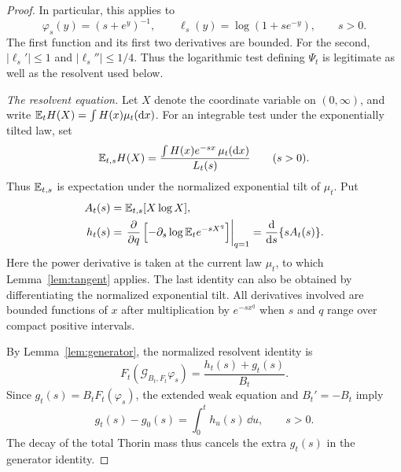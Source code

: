 \begin{proof}
In particular, this applies to
\[
 \varphi_s(y)=(s+e^y)^{-1},\qquad \ell_s(y)=\log(1+se^{-y}),\qquad s>0.
\]
The first function and its first two derivatives are bounded.
For the second, $|\ell_s'|\le1$ and $|\ell_s''|\le1/4$.
Thus the logarithmic test defining $\Psi_t$ is legitimate as well as the resolvent used below.

\medskip\noindent\emph{The resolvent equation.}
Let $X$ denote the coordinate variable on $(0,\infty)$, and write $\mathbb E_t H(X)=\int H(x)\mu_t(\mathop{}\!\mathrm d x)$.
For an integrable test under the exponentially tilted law, set
\[
 \mathbb E_{t,s}H(X)=\frac{\int H(x)e^{-sx}\,\mu_t(\mathop{}\!\mathrm d x)}{L_t(s)}
 \qquad(s>0).
\]
Thus $\mathbb E_{t,s}$ is expectation under the normalized exponential tilt of $\mu_t$.
Put
\begin{equation}
 \begin{aligned}
 A_t(s)&=\mathbb E_{t,s}[X\log X],\\
 h_t(s)&=\left.\frac{\partial}{\partial q}
 \left[-\partial_s\log\mathbb E_t e^{-sX^q}\right]\right|_{q=1}
 =\frac{\mathop{}\!\mathrm d}{\mathop{}\!\mathrm d s}\{sA_t(s)\}.
 \end{aligned}
 \label{eq:id-current-tangent}
\end{equation}
Here the power derivative is taken at the current law $\mu_t$, to which Lemma~\ref{lem:tangent} applies.
The last identity can also be obtained by differentiating the normalized exponential tilt.
All derivatives involved are bounded functions of $x$ after multiplication by $e^{-sx^q}$ when $s$ and $q$ range over compact positive intervals.

By Lemma~\ref{lem:generator}, the normalized resolvent identity is
\[
 F_t(\mathcal G_{B_t,F_t}\varphi_s)=\frac{h_t(s)+g_t(s)}{B_t}.
\]
Since $g_t(s)=B_tF_t(\varphi_s)$, the extended weak equation and $B_t'=-B_t$ imply
\begin{equation}
 g_t(s)-g_0(s)=\int_0^t h_u(s)\,\dd u,
 \qquad s>0.
 \label{eq:id-resolvent-evolution}
\end{equation}
The decay of the total Thorin mass thus cancels the extra $g_t(s)$ in the generator identity.


\end{proof}
